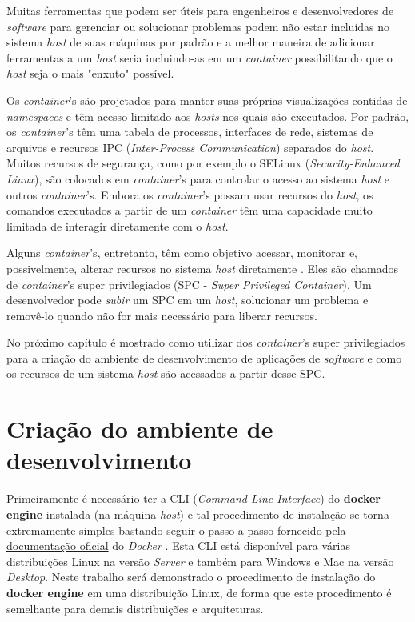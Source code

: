\documentclass[
  12pt,				%
  openright,			%
  twoside,			%
  a4paper,			%
  english,			%
  french,				%
  spanish,			%
  brazil,				%
  ]{abntex2}
\begin{document}
Muitas ferramentas que podem ser úteis para engenheiros e desenvolvedores de \textit{software} para gerenciar ou solucionar problemas podem não estar
incluídas no sistema \textit{host} de suas máquinas por padrão e a melhor maneira de adicionar ferramentas a um \textit{host} seria
incluindo-as em um \textit{container} possibilitando que o \textit{host} seja o mais "enxuto" possível.

Os \textit{container}'s são projetados para manter suas próprias visualizações contidas de \textit{namespaces} e têm acesso limitado aos \textit{hosts} nos quais
são executados. Por padrão, os \textit{container}'s têm uma tabela de processos, interfaces de rede, sistemas de arquivos e recursos IPC
(\textit{Inter-Process Communication}) separados do \textit{host}.
Muitos recursos de segurança, como por exemplo o SELinux (\textit{Security-Enhanced Linux}), são colocados em \textit{container}'s para controlar o acesso ao sistema \textit{host} e outros
\textit{container}'s. Embora os \textit{container}'s possam usar recursos do \textit{host}, os comandos executados a partir de um \textit{container} têm uma capacidade muito
limitada de interagir diretamente com o \textit{host}.

Alguns \textit{container}'s, entretanto, têm como objetivo acessar, monitorar e, possivelmente, alterar recursos no sistema \textit{host}
diretamente \cite{RHEL-container:2020}. Eles são chamados de \textit{container}'s super privilegiados (SPC - \textit{Super Privileged Container}). Um desenvolvedor
pode \textit{subir} um SPC em um \textit{host}, solucionar um problema e removê-lo quando não for mais necessário para liberar recursos.

No próximo capítulo é mostrado como utilizar dos \textit{container}'s super privilegiados para a criação do ambiente de
desenvolvimento de aplicações de \textit{software} e como os recursos de um sistema \textit{host} são acessados a partir desse SPC.

\section*{Criação do ambiente de desenvolvimento}

Primeiramente é necessário ter a CLI (\textit{Command Line Interface}) do \textbf{docker engine} instalada (na máquina \textit{host}) e tal procedimento de
instalação se torna extremamente simples bastando seguir o passo-a-passo fornecido pela \href{https://docs.docker.com/engine/install/}{documentação oficial}
do \textit{Docker} \cite{Docker:2020}.
Esta CLI está disponível para várias distribuições Linux na versão \textit{Server} e também para Windows e Mac na versão \textit{Desktop}. Neste trabalho será
demonstrado o procedimento de instalação do \textbf{docker engine} em uma distribuição Linux, de forma que este procedimento é semelhante para demais distribuições
e arquiteturas.
\end{document}
